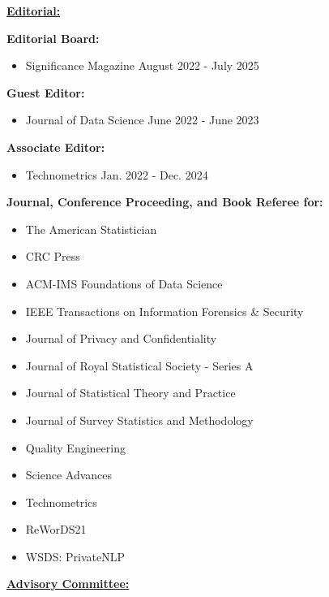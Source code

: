 \documentclass[11pt, letterpaper, roman]{moderncv} %
\newcommand{\professionalspace}{\vspace{8pt}}
\begin{document}
\professionalspace
\underline{\textbf{\large Editorial:}}\normalsize

\textbf{Editorial Board:}
\begin{itemize}
    \item Significance Magazine \hfill August 2022 - July 2025
\end{itemize}

\vspace{2pt}
\textbf{Guest Editor:}
\begin{itemize}
    \item Journal of Data Science \hfill June 2022 - June 2023
\end{itemize}

\vspace{2pt}
\textbf{Associate Editor:}
\begin{itemize}
    \item Technometrics \hfill Jan. 2022 - Dec. 2024
\end{itemize}

\vspace{4pt}
\textbf{Journal, Conference Proceeding, and Book Referee for:}
\vspace{-10pt}
\begin{multicols}{2}
    \begin{itemize}
        \item The American Statistician
        \item CRC Press
        \item ACM-IMS Foundations of Data Science
        \item IEEE Transactions on Information Forensics \& Security
        \item Journal of Privacy and Confidentiality
        \item Journal of Royal Statistical Society - Series A
        \item Journal of Statistical Theory and Practice
        \item Journal of Survey Statistics and Methodology
        \item Quality Engineering
        \item Science Advances
        \item Technometrics
        \item ReWorDS21
        \item WSDS: PrivateNLP
    \end{itemize}
\end{multicols}

\underline{\textbf{\large Advisory Committee:}}\normalsize
\end{document}
